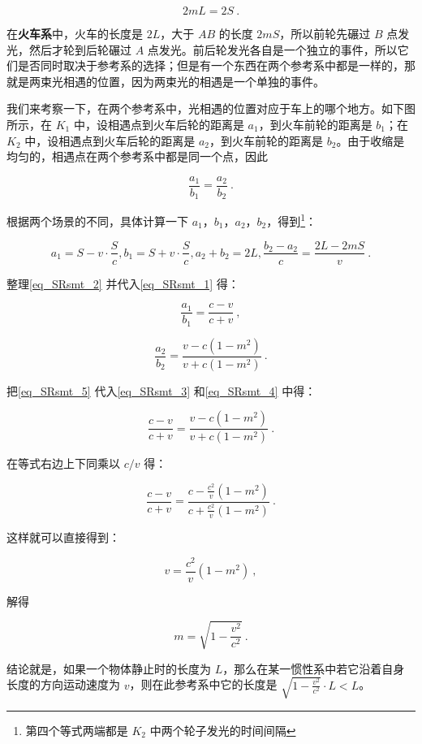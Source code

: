 \begin{equation}\label{eq_SRsmt_1}
2mL=2S~.
\end{equation}

在\textbf{火车系}中，火车的长度是 $2L$，大于 $AB$ 的长度 $2mS$，所以前轮先碾过 $B$ 点发光，然后才轮到后轮碾过 $A$ 点发光。前后轮发光各自是一个独立的事件，所以它们是否同时取决于参考系的选择；但是有一个东西在两个参考系中都是一样的，那就是两束光相遇的位置，因为两束光的相遇是一个单独的事件。

我们来考察一下，在两个参考系中，光相遇的位置对应于车上的哪个地方。如下图所示，在 $K_1$ 中，设相遇点到火车后轮的距离是 $a_1$，到火车前轮的距离是 $b_1$；在 $K_2$ 中，设相遇点到火车后轮的距离是 $a_2$，到火车前轮的距离是 $b_2$。由于收缩是均匀的，相遇点在两个参考系中都是同一个点，因此

\begin{equation}\label{eq_SRsmt_5}
\frac{a_1}{b_1}=\frac{a_2}{b_2}~.
\end{equation}

根据两个场景的不同，具体计算一下 $a_1$，$b_1$，$a_2$，$b_2$，得到\footnote{第四个等式两端都是 $K_2$ 中两个轮子发光的时间间隔}：

\begin{equation}\label{eq_SRsmt_2}
a_1=S-v\cdot\frac{S}{c},b_1=S+v\cdot\frac{S}{c},a_2+b_2=2L,\frac{b_2-a_2}{c}=\frac{2L-2mS}{v}~.
\end{equation}

整理\autoref{eq_SRsmt_2} 并代入\autoref{eq_SRsmt_1} 得：

\begin{equation}\label{eq_SRsmt_3}
\frac{a_1}{b_1}=\frac{c-v}{c+v}~,
\end{equation}

\begin{equation}\label{eq_SRsmt_4}
\frac{a_2}{b_2}=\frac{v-c(1-m^2)}{v+c(1-m^2)}~.
\end{equation}

把\autoref{eq_SRsmt_5} 代入\autoref{eq_SRsmt_3} 和\autoref{eq_SRsmt_4} 中得：

\begin{equation}
\frac{c-v}{c+v}=\frac{v-c(1-m^2)}{v+c(1-m^2)}~.
\end{equation}

在等式右边上下同乘以 $c/v$ 得：

\begin{equation}
\frac{c-v}{c+v}=\frac{c-\frac{c^2}{v}(1-m^2)}{c+\frac{c^2}{v}(1-m^2)}~.
\end{equation}

这样就可以直接得到：

\begin{equation}
v=\frac{c^2}{v}(1-m^2)~,
\end{equation}

解得

\begin{equation}
m=\sqrt{1-\frac{v^2}{c^2}}~.
\end{equation}

结论就是，如果一个物体静止时的长度为 $L$，那么在某一惯性系中若它沿着自身长度的方向运动速度为 $v$，则在此参考系中它的长度是 $\sqrt{1-\frac{v^2}{c^2}}\cdot L<L$。






